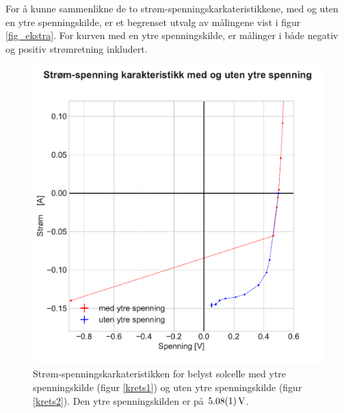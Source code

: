 \documentclass[%
 reprint,
 amsmath,amssymb,
 aps,
 norsk,
 booktabs
]{revtex4-1}
\begin{document}
For å kunne sammenlikne de to strøm-spenningskarkateristikkene, med og uten en ytre spenningskilde, er et begrenset utvalg av målingene vist i figur \vref{fig_ekstra}. For kurven med en ytre spenningskilde, er målinger i både negativ og positiv strømretning inkludert.
\begin{figure}
  \centering
  \includegraphics[scale=0.47]{ytre_spenning_sammen.pdf}
  \caption{Strøm-spenningskarkateristikken for belyst solcelle med ytre spenningskilde (figur \vref{krets1}) og uten ytre spenningskilde (figur \vref{krets2}). Den ytre spenningskilden er på $\SI{5.08\pm0.01}{\volt}$.}
  \label{fig_ekstra}
\end{figure}
\end{document}
